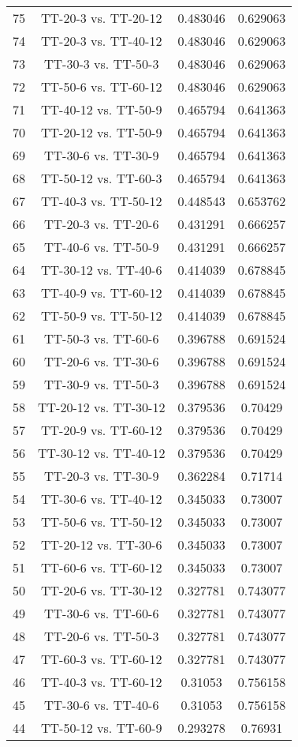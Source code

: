 \documentclass[a4paper,10pt]{article}
\begin{document}
\begin{landscape}
\begin{table}[!htp]
\begin{tabular}{cccc}
75&TT-20-3 vs. TT-20-12&0.483046&0.629063\\
74&TT-20-3 vs. TT-40-12&0.483046&0.629063\\
73&TT-30-3 vs. TT-50-3&0.483046&0.629063\\
72&TT-50-6 vs. TT-60-12&0.483046&0.629063\\
71&TT-40-12 vs. TT-50-9&0.465794&0.641363\\
70&TT-20-12 vs. TT-50-9&0.465794&0.641363\\
69&TT-30-6 vs. TT-30-9&0.465794&0.641363\\
68&TT-50-12 vs. TT-60-3&0.465794&0.641363\\
67&TT-40-3 vs. TT-50-12&0.448543&0.653762\\
66&TT-20-3 vs. TT-20-6&0.431291&0.666257\\
65&TT-40-6 vs. TT-50-9&0.431291&0.666257\\
64&TT-30-12 vs. TT-40-6&0.414039&0.678845\\
63&TT-40-9 vs. TT-60-12&0.414039&0.678845\\
62&TT-50-9 vs. TT-50-12&0.414039&0.678845\\
61&TT-50-3 vs. TT-60-6&0.396788&0.691524\\
60&TT-20-6 vs. TT-30-6&0.396788&0.691524\\
59&TT-30-9 vs. TT-50-3&0.396788&0.691524\\
58&TT-20-12 vs. TT-30-12&0.379536&0.70429\\
57&TT-20-9 vs. TT-60-12&0.379536&0.70429\\
56&TT-30-12 vs. TT-40-12&0.379536&0.70429\\
55&TT-20-3 vs. TT-30-9&0.362284&0.71714\\
54&TT-30-6 vs. TT-40-12&0.345033&0.73007\\
53&TT-50-6 vs. TT-50-12&0.345033&0.73007\\
52&TT-20-12 vs. TT-30-6&0.345033&0.73007\\
51&TT-60-6 vs. TT-60-12&0.345033&0.73007\\
50&TT-20-6 vs. TT-30-12&0.327781&0.743077\\
49&TT-30-6 vs. TT-60-6&0.327781&0.743077\\
48&TT-20-6 vs. TT-50-3&0.327781&0.743077\\
47&TT-60-3 vs. TT-60-12&0.327781&0.743077\\
46&TT-40-3 vs. TT-60-12&0.31053&0.756158\\
45&TT-30-6 vs. TT-40-6&0.31053&0.756158\\
44&TT-50-12 vs. TT-60-9&0.293278&0.76931\\

\end{tabular}
\end{table}
\end{landscape}
\end{document}
